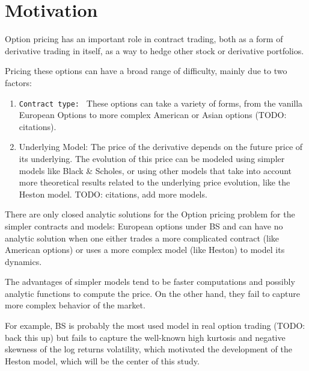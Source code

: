 \documentclass[12,twoside]{mammeTFM}
\theoremstyle{definition}
\theoremstyle{remark}
\begin{document}
\maketitle

\tableofcontents

\pagebreak


\section{Motivation}

Option pricing has an important role in contract trading, both as a form of derivative trading in itself, as a way to hedge other stock or derivative portfolios.

Pricing these options can have a broad range of difficulty, mainly due to two factors:
\begin{enumerate}[\bf (1)]
\item {\tt Contract type: } These options can take a variety of forms, from the vanilla European Options to more complex American or Asian options (TODO: citations).
\item {Underlying Model: } The price of the derivative depends on the future price of its underlying. The evolution of this price can be modeled using simpler models like Black \& Scholes, or using other models that take into account more theoretical results related to the underlying price evolution, like the Heston model. {TODO: citations, add more models.}
\end{enumerate}

There are only closed analytic solutions for the Option pricing problem for the simpler contracts and models: European options under BS and can have no analytic solution when one either trades a more complicated contract (like American options) or uses a more complex model (like Heston) to model its dynamics.

The advantages of simpler models tend to be faster computations and possibly analytic functions to compute the price. On the other hand, they fail to capture more complex behavior of the market.

For example, BS is probably the most used model in real option trading (TODO: back this up) but fails to capture the well-known high kurtosis and negative skewness of the log returns volatility, which motivated the development of the Heston model, which will be the center of this study.
\end{document}
